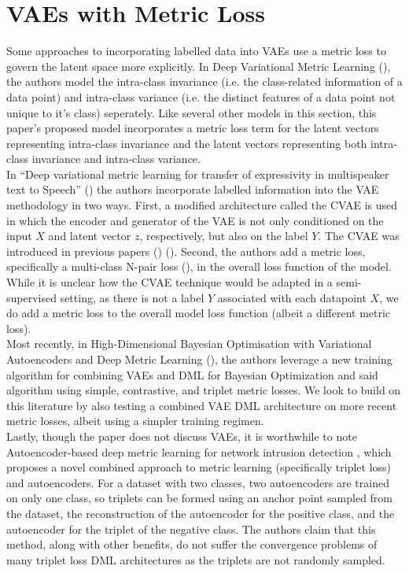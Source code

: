 \documentclass[./dissertation.tex]{subfiles}
\begin{document}
\section{VAEs with Metric Loss}

Some approaches to incorporating labelled data into VAEs use a metric loss to govern the latent space more explicitly. In Deep Variational Metric Learning (\cite{lin2018deep}), the authors model the intra-class invariance (i.e. the class-related information of a data point) and intra-class variance (i.e. the distinct features of a data point not unique to it's class) seperately. Like several other models in this section, this paper's proposed model incorporates a metric loss term for the latent vectors representing intra-class invariance and the latent vectors representing both intra-class invariance and intra-class variance. \\

In ``Deep variational metric learning for transfer of expressivity in multispeaker text to Speech'' (\cite{kulkarni2020deep}) the authors incorporate labelled information into the VAE methodology in two ways. First, a modified architecture called the CVAE is used in which the encoder and generator of the VAE is not only conditioned on the input $X$ and latent vector $z$, respectively, but also on the label $Y$. The CVAE was introduced in previous papers (\cite{sohn2015learning}) (\cite{dahmani2019conditional}). Second, the authors add a metric loss, specifically a multi-class N-pair loss (\cite{sohn2016improved}), in the overall loss function of the model. While it is unclear how the CVAE technique would be adapted in a semi-supervised setting, as there is not a label $Y$ associated with each datapoint $X$, we do add a metric loss to the overall model loss function (albeit a different metric loss). \\
    
Most recently, in High-Dimensional Bayesian Optimisation with Variational Autoencoders and Deep Metric Learning (\cite{grosnit2021high}), the authors leverage a new training algorithm for combining VAEs and DML for Bayesian Optimization and said algorithm using simple, contrastive, and triplet metric losses. We look to build on this literature by also testing a combined VAE DML architecture on more recent metric losses, albeit using a simpler training regimen. \\

Lastly, though the paper does not discuss VAEs, it is worthwhile to note Autoencoder-based deep metric learning for network intrusion detection \cite{ANDRESINI2021706}, which proposes a novel combined approach to metric learning (specifically triplet loss) and autoencoders. For a dataset with two classes, two autoencoders are trained on only one class, so triplets can be formed using an anchor point sampled from the dataset, the reconstruction of the autoencoder for the positive class, and the autoencoder for the triplet of the negative class. The authors claim that this method, along with other benefits, do not suffer the convergence problems of many triplet loss DML architectures as the triplets are not randomly sampled.
\end{document}
